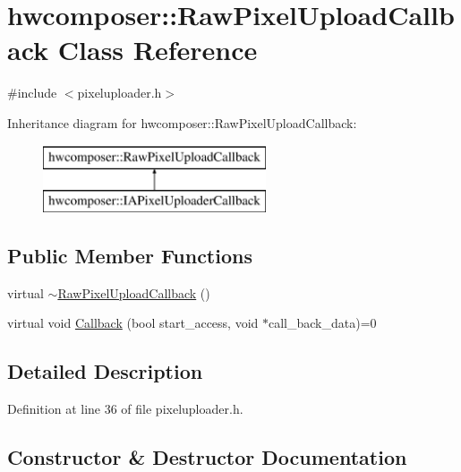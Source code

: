 \hypertarget{classhwcomposer_1_1RawPixelUploadCallback}{}\section{hwcomposer\+:\+:Raw\+Pixel\+Upload\+Callback Class Reference}
\label{classhwcomposer_1_1RawPixelUploadCallback}


{\ttfamily \#include $<$pixeluploader.\+h$>$}

Inheritance diagram for hwcomposer\+:\+:Raw\+Pixel\+Upload\+Callback\+:\begin{figure}[H]
\begin{center}
\leavevmode
\includegraphics[height=2.000000cm]{classhwcomposer_1_1RawPixelUploadCallback}
\end{center}
\end{figure}
\subsection*{Public Member Functions}
\begin{DoxyCompactItemize}
\item 
virtual \mbox{\hyperlink{classhwcomposer_1_1RawPixelUploadCallback_af9f1272116ec42807fe0e93a2f267da1}{$\sim$\+Raw\+Pixel\+Upload\+Callback}} ()
\item 
virtual void \mbox{\hyperlink{classhwcomposer_1_1RawPixelUploadCallback_a37aa7f3e3a5b5e9b43d1a11f56806979}{Callback}} (bool start\+\_\+access, void $\ast$call\+\_\+back\+\_\+data)=0
\end{DoxyCompactItemize}


\subsection{Detailed Description}


Definition at line 36 of file pixeluploader.\+h.



\subsection{Constructor \& Destructor Documentation}
\mbox{\label{classhwcomposer_1_1RawPixelUploadCallback_af9f1272116ec42807fe0e93a2f267da1}} 
